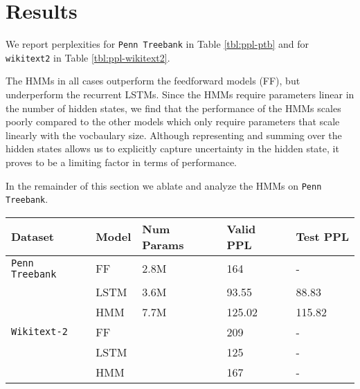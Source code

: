 \documentclass[11pt,a4paper]{article}
\begin{document}
\section{Results}
We report perplexities 
for \texttt{Penn Treebank} in Table \ref{tbl:ppl-ptb} and for 
\texttt{wikitext2} in Table \ref{tbl:ppl-wikitext2}.

The HMMs in all cases outperform the feedforward models (FF),
but underperform the recurrent LSTMs.
Since the HMMs require parameters linear in the number of hidden states,
we find that the performance of the HMMs scales poorly compared to the other models
which only require parameters that scale linearly with the vocbaulary size.
Although representing and summing over the hidden states
allows us to explicitly capture uncertainty in the hidden state,
it proves to be a limiting factor in terms of performance.

In the remainder of this section we ablate and analyze the HMMs on \texttt{Penn Treebank}.


\begin{table*}[!t]
\centering
\caption{\label{tbl:ppl-ptb}
Perplexities on the \texttt{Penn Treebank} dataset.
The FF model is a 256-dim 2-layer feedforward neural network
with a window of 4 previous tokens with 0.3 dropout.
The LSTM is a 256-dim 2-layer recurrent neural network with 0.3 dropout.
The HMM is a 64k-state HMM with 0.5 state dropout.
}
\begin{tabular}{lllll}
\toprule
Dataset & Model & Num Params & Valid PPL & Test PPL\\
\midrule
\texttt{Penn Treebank}
& FF    & 2.8M       & 164         & -       \\
& LSTM  & 3.6M       & 93.55       & 88.83   \\
& HMM   & 7.7M       & 125.02      & 115.82  \\
\midrule
\texttt{Wikitext-2}
& FF    &            & 209       & -       \\
& LSTM  &            & 125       & -       \\
& HMM   &            & 167       & -       \\
\bottomrule
\end{tabular}
\end{table*}
\end{document}
